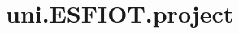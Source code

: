 \chapter{uni.\+ESFIOT.\+project}
\hypertarget{md__r_e_a_d_m_e}{}\label{md__r_e_a_d_m_e}
\label{md__r_e_a_d_m_e_autotoc_md0}%
%
